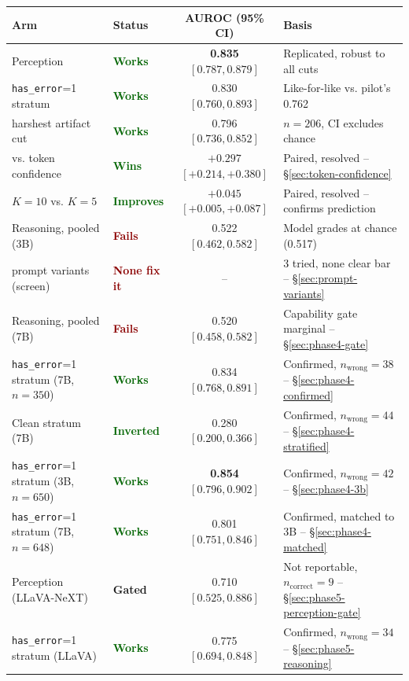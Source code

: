 \documentclass[11pt]{article}
\newcommand{\worked}[1]{\textcolor{darkgreen}{\textbf{#1}}}
\newcommand{\failed}[1]{\textcolor{darkred}{\textbf{#1}}}
\newcommand{\unresolved}[1]{\textcolor{darkamber}{\textbf{#1}}}
\begin{document}
\begin{center}
\begin{tabular}{llcl}
\toprule
Arm & Status & AUROC (95\% CI) & Basis \\
\midrule
Perception & \worked{Works} & \textbf{0.835} $[0.787, 0.879]$ & Replicated, robust to all cuts \\
\quad \texttt{has\_error}=1 stratum & \worked{Works} & 0.830 $[0.760, 0.893]$ & Like-for-like vs. pilot's 0.762 \\
\quad harshest artifact cut & \worked{Works} & 0.796 $[0.736, 0.852]$ & $n=206$, CI excludes chance \\
\quad vs. token confidence & \worked{Wins} & $+0.297$ $[+0.214, +0.380]$ & Paired, resolved -- \S\ref{sec:token-confidence} \\
\quad $K=10$ vs. $K=5$ & \worked{Improves} & $+0.045$ $[+0.005, +0.087]$ & Paired, resolved -- confirms prediction \\
Reasoning, pooled (3B) & \failed{Fails} & 0.522 $[0.462, 0.582]$ & Model grades at chance (0.517) \\
\quad prompt variants (screen) & \failed{None fix it} & -- & 3 tried, none clear bar -- \S\ref{sec:prompt-variants} \\
Reasoning, pooled (7B) & \failed{Fails} & 0.520 $[0.458, 0.582]$ & Capability gate marginal -- \S\ref{sec:phase4-gate} \\
\quad \texttt{has\_error}=1 stratum (7B, $n=350$) & \worked{Works} & 0.834 $[0.768, 0.891]$ & Confirmed, $n_{\text{wrong}}=38$ -- \S\ref{sec:phase4-confirmed} \\
\quad Clean stratum (7B) & \worked{Inverted} & 0.280 $[0.200, 0.366]$ & Confirmed, $n_{\text{wrong}}=44$ -- \S\ref{sec:phase4-stratified} \\
\quad \texttt{has\_error}=1 stratum (3B, $n=650$) & \worked{Works} & \textbf{0.854} $[0.796, 0.902]$ & Confirmed, $n_{\text{wrong}}=42$ -- \S\ref{sec:phase4-3b} \\
\quad \texttt{has\_error}=1 stratum (7B, $n=648$) & \worked{Works} & 0.801 $[0.751, 0.846]$ & Confirmed, matched to 3B -- \S\ref{sec:phase4-matched} \\
Perception (LLaVA-NeXT) & \unresolved{Gated} & 0.710 $[0.525, 0.886]$ & Not reportable, $n_{\text{correct}}=9$ -- \S\ref{sec:phase5-perception-gate} \\
\quad \texttt{has\_error}=1 stratum (LLaVA) & \worked{Works} & 0.775 $[0.694, 0.848]$ & Confirmed, $n_{\text{wrong}}=34$ -- \S\ref{sec:phase5-reasoning} \\

\end{tabular}
\end{center}
\end{document}
